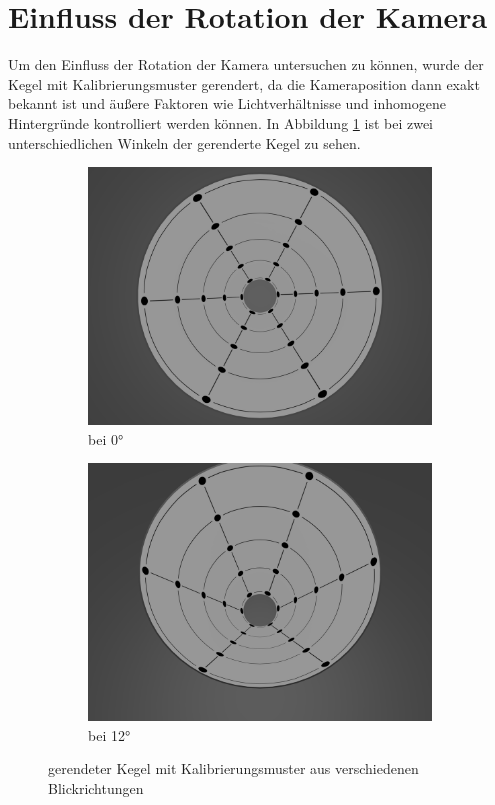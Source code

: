 \section{Einfluss der Rotation der Kamera}
Um den Einfluss der Rotation der Kamera untersuchen zu können, wurde der Kegel mit Kalibrierungsmuster gerendert, da die Kameraposition dann exakt bekannt ist und äußere Faktoren wie Lichtverhältnisse und inhomogene Hintergründe kontrolliert werden können. In Abbildung \ref{fig:blender} ist bei zwei unterschiedlichen Winkeln der gerenderte Kegel zu sehen.

\begin{figure}[!htb]
	\centering
	\begin{subfigure}{.5\textwidth}
		\centering
		\includegraphics[width=.9\textwidth]{images/blender0.png}
		\caption{bei 0°}
	\end{subfigure}%
	\begin{subfigure}{.5\textwidth}
		\centering
		\includegraphics[width=.9\textwidth]{images/blender12.png}
		\caption{bei 12°}
	\end{subfigure}
	\caption{gerendeter Kegel mit Kalibrierungsmuster aus verschiedenen Blickrichtungen}
	\label{fig:blender}
\end{figure}


